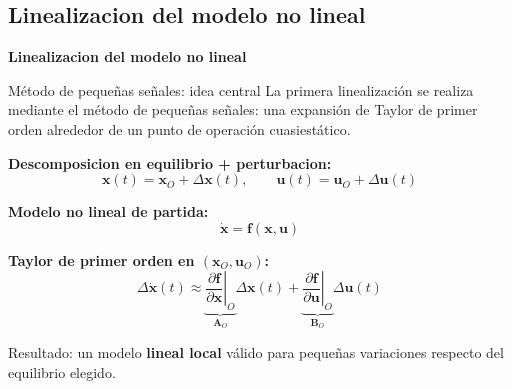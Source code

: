 \documentclass[aspectratio=169,t]{beamer}
\newcommand{\sectionslide}[1]{%
  \begin{frame}[plain]
    \vfill
    \centering
    {\Huge\bfseries\color{uncBlue} #1\par}
    \vfill
  \end{frame}
}
\begin{document}
\subsection{Linealizacion del modelo no lineal}
\sectionslide{Linealizacion del modelo no lineal}

\begin{frame}{Método de pequeñas señales: idea central}
{\small\color{uncGray}La primera linealización se realiza mediante el método de pequeñas señales: una expansión de Taylor de primer orden alrededor de un punto de operación cuasiestático.}\par
\vspace{3mm}

\textbf{Descomposicion en equilibrio + perturbacion:}
\begin{equation*}
\bm{x}(t)=\bm{x}_O+\Delta\bm{x}(t),
\qquad
\bm{u}(t)=\bm{u}_O+\Delta\bm{u}(t)
\end{equation*}

\textbf{Modelo no lineal de partida:}
\begin{equation*}
\dot{\bm{x}}=\bm{f}(\bm{x},\bm{u})
\end{equation*}

\textbf{Taylor de primer orden en $(\bm{x}_O,\bm{u}_O)$:}
\begin{equation*}
\Delta\dot{\bm{x}}(t)\approx
\underbrace{\left.\frac{\partial \bm{f}}{\partial \bm{x}}\right|_O}_{\bm{A}_O}
\Delta\bm{x}(t)+
\underbrace{\left.\frac{\partial \bm{f}}{\partial \bm{u}}\right|_O}_{\bm{B}_O}
\Delta\bm{u}(t)
\end{equation*}

{\small Resultado: un modelo \textbf{lineal local} válido para pequeñas variaciones respecto del equilibrio elegido.}
\end{frame}
\end{document}
